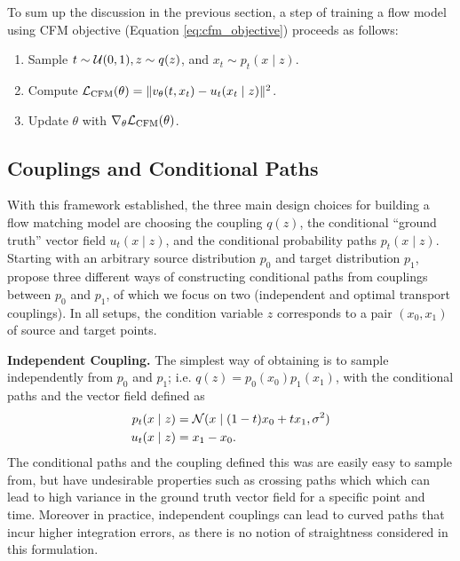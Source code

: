 To sum up the discussion in the previous section, a step of training a flow model using CFM objective (Equation \ref{eq:cfm_objective}) proceeds as follows:
\begin{enumerate}
    \item Sample $t \sim \mathcal{U}(0,1), z \sim q(z)$, and $x_t \sim p_t(x \mid z)$.
    \item Compute $\mathcal{L}_{\text{CFM}}(\theta) = \Vert v_\theta(t, x_t) - u_t(x_t \mid z) \Vert ^2$.
    \item Update $\theta$ with $\nabla_\theta \mathcal{L}_{\text{CFM}}(\theta)$.
\end{enumerate}

\subsection{Couplings and Conditional Paths} \label{section:design_choices}

With this framework established, the three main design choices for building a flow matching model are choosing the coupling $q(z)$, the conditional ``ground truth'' vector field $u_t(x \mid z)$, and the conditional probability paths $p_t(x \mid z)$. Starting with an arbitrary source distribution $p_0$ and target distribution $p_1$, \citet{tongImprovingGeneralizingFlowbased2023} propose three different ways of constructing conditional paths from couplings between $p_0$ and $p_1$, of which we focus on two (independent and optimal transport couplings). In all setups, the condition variable $z$ corresponds to a pair $(x_0, x_1)$ of source and target points. 

\textbf{Independent Coupling.} The simplest way of obtaining is to sample independently from $p_0$ and $p_1$; i.e. $q(z) = p_0(x_0) p_1(x_1)$, with the conditional paths and the vector field defined as 
\begin{align} 
    p_t(x \mid z) &= \mathcal{N}(x \mid (1-t)x_0 + t x_1, \sigma^2) \label{eq:cond_path} \\
    u_t(x \mid z) &= x_1 - x_0. \label{eq:cond_vector_field}
\end{align}
The conditional paths and the coupling defined this was are easily easy to sample from, but have undesirable properties such as crossing paths which which can lead to high variance in the ground truth vector field for a specific point and time. Moreover in practice, independent couplings can lead to curved paths that incur higher integration errors, as there is no notion of straightness considered in this formulation.

